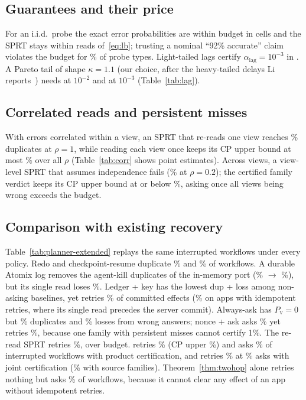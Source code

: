 \subsection{Guarantees and their price}
\label{sec:eval-guar}
For an i.i.d.\ probe the exact error probabilities are within budget in \SprtAllWithin \SprtCells cells and the SPRT stays within \SprtGapMax reads of~\eqref{eq:lb};
trusting a nominal ``92\% accurate'' claim violates the budget for \CalNomViol\% of probe types. Light-tailed lags certify $\alpha_{\mathrm{lag}}{=}10^{-3}$ in
\LagLogThree. A Pareto tail of shape $\kappa{=}1.1$ (our choice, after the heavy-tailed delays Li reports~\cite{li2026exactlyonce}) needs \LagParetoTwo{} at $10^{-2}$ and
\LagParetoThree{} at $10^{-3}$ (Table~\ref{tab:lag}).

\subsection{Correlated reads and persistent misses}
\label{sec:eval-robust}
With errors correlated within a view, an SPRT that re-reads one view reaches \CorrNaiveOne\% duplicates at $\rho{=}1$, while reading each view once keeps its CP upper bound at most
\CorrViewWithinMax\% over all $\rho$ (Table~\ref{tab:corr} shows point estimates). Across views, a view-level SPRT that assumes independence fails (\CorrViewCrossTwo\% at $\rho{=}0.2$); the certified
family verdict keeps its CP upper bound at or below \CorrCertMaxHi\%, asking once all views being wrong exceeds the budget.


\subsection{Comparison with existing recovery}
\label{sec:eval-e2e}
Table~\ref{tab:planner-extended} replays the same \SimN interrupted workflows under every policy. Redo and checkpoint-resume duplicate \SimRedoDup\% and \SimCkptDup\% of workflows.
A durable Atomix log removes the agent-kill duplicates of the in-memory port (\SimAtomixDup\% $\to$ \SimAtomixDurDup\%), but its single read loses \SimAtomixDurLoss\%. Ledger + key has
the lowest dup + loss among non-asking baselines, yet retries \SimKeyPv\% of committed effects (\ClassKeyGtwoPv\% on apps with idempotent retries, where its single read precedes the server commit).
Always-ask has $P_{\mathrm{v}}{=}0$ but \SimAskAllDup\% duplicates and \SimAskAllLoss\% losses from wrong answers; nonce + ask asks \SimNonceAskAsk\% yet retries \SimNonceAskPv\%,
because one family with persistent misses cannot certify 1\%. The re-read SPRT retries \SimVonePv\%, over budget. \sys retries \SimGhostPv\% (CP upper \SimGhostPvHi\%) and asks \SimGhostAsk\% of interrupted workflows with product certification, and retries
\SimJointPv\% at \SimJointAsk\% asks with joint certification (\SimSrcAsk\% with source families). Theorem~\ref{thm:twohop} alone retries nothing but asks
\SimGtwoAsk\% of workflows, because it cannot clear any effect of an app without idempotent retries.

